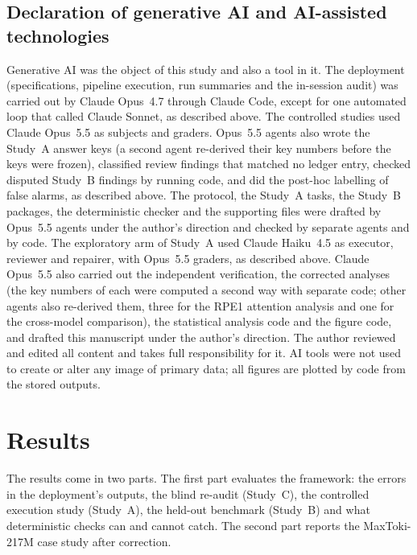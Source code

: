 \documentclass[10pt,letterpaper]{article}
\begin{document}
\subsection*{Declaration of generative AI and AI-assisted technologies}
Generative AI was the object of this study and also a tool in it. The
deployment (specifications, pipeline execution, run summaries and the
in-session audit) was carried out by Claude Opus~4.7 through Claude Code,
except for one automated loop that called Claude Sonnet, as described
above. The controlled studies used Claude Opus~5.5 as subjects
and graders. Opus~5.5 agents also wrote the Study~A answer keys (a
second agent re-derived their key numbers before the keys were frozen),
classified review findings that matched no ledger entry, checked disputed
Study~B findings by running code, and did the post-hoc labelling of false
alarms, as described above. The protocol, the Study~A tasks, the Study~B
packages, the deterministic checker and the supporting files were drafted
by Opus~5.5 agents under the author's direction and checked by separate
agents and by code. The exploratory arm of Study~A used Claude Haiku~4.5 as
executor, reviewer and repairer, with Opus~5.5 graders, as described
above. Claude Opus~5.5 also carried out the independent verification, the
corrected analyses (the key numbers of each were computed a second way
with separate code; other agents also re-derived them, three for the RPE1
attention analysis and one for the cross-model comparison), the statistical
analysis code and the figure code, and
drafted this manuscript under the author's direction. The author reviewed
and edited all content and takes full responsibility for it. AI tools were
not used to create or alter any image of primary data; all figures are
plotted by code from the stored outputs.

\section*{Results}

The results come in two parts. The first part evaluates the framework:
the errors in the deployment's outputs, the blind re-audit (Study~C), the
controlled execution study (Study~A), the held-out benchmark (Study~B)
and what deterministic checks can and cannot catch. The second part
reports the MaxToki-217M case study after correction.
\end{document}
